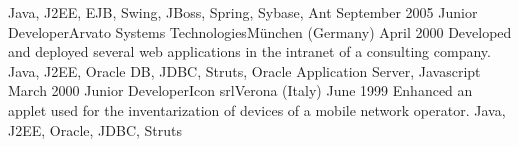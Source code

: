 \begin{experiences}
                    {Java, J2EE, EJB, Swing, JBoss, Spring, Sybase, Ant}
  \emptySeparator
  \consultantexperience
  {September 2005}   {Junior Developer}{Arvato Systems Technologies}{München (Germany)}
  {April 2000}       {
                     	  Developed and deployed several web applications in the intranet of a consulting company.
                     }
                     {Java, J2EE, Oracle DB, JDBC, Struts, Oracle Application Server, Javascript}
  \emptySeparator
  \consultantexperience
  {March 2000}  	{Junior Developer}{Icon srl}{Verona (Italy)}
  {June 1999}   	{ 
  				 		Enhanced an applet used for the inventarization of devices of a mobile network operator.
  				 	}
                	{Java, J2EE, Oracle, JDBC, Struts} 
\end{experiences}

